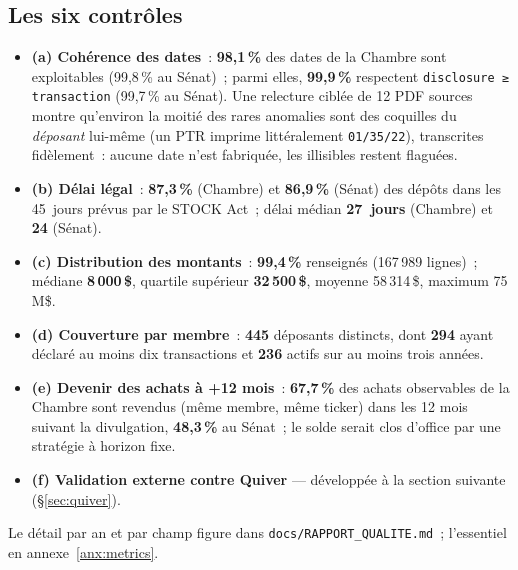 \documentclass[11pt,a4paper]{article}
\newcommand{\co}[1]{\texttt{\small #1}}
\begin{document}
\subsection{Les six contrôles}
\begin{itemize}[nosep,leftmargin=1.5em]
\item \textbf{(a) Cohérence des dates}~: \textbf{98,1\,\%} des dates de la Chambre sont exploitables
(99,8\,\% au Sénat)~; parmi elles, \textbf{99,9\,\%} respectent \co{disclosure ≥ transaction}
(99,7\,\% au Sénat). Une relecture ciblée de 12 PDF sources montre qu'environ la moitié des rares
anomalies sont des coquilles du \emph{déposant} lui-même (un PTR imprime littéralement \co{01/35/22}),
transcrites fidèlement~: aucune date n'est fabriquée, les illisibles restent flaguées.
\item \textbf{(b) Délai légal}~: \textbf{87,3\,\%} (Chambre) et \textbf{86,9\,\%} (Sénat) des dépôts dans
les 45~jours prévus par le STOCK Act~; délai médian \textbf{27~jours} (Chambre) et \textbf{24} (Sénat).
\item \textbf{(c) Distribution des montants}~: \textbf{99,4\,\%} renseignés (167\,989 lignes)~; médiane
\textbf{8\,000\,\$}, quartile supérieur \textbf{32\,500\,\$}, moyenne 58\,314\,\$, maximum 75\,M\$.
\item \textbf{(d) Couverture par membre}~: \textbf{445} déposants distincts, dont \textbf{294} ayant
déclaré au moins dix transactions et \textbf{236} actifs sur au moins trois années.
\item \textbf{(e) Devenir des achats à +12 mois}~: \textbf{67,7\,\%} des achats observables de la Chambre
sont revendus (même membre, même ticker) dans les 12 mois suivant la divulgation, \textbf{48,3\,\%} au
Sénat~; le solde serait clos d'office par une stratégie à horizon fixe.
\item \textbf{(f) Validation externe contre Quiver} — développée à la section suivante
(\S{}\ref{sec:quiver}).
\end{itemize}
Le détail par an et par champ figure dans \co{docs/RAPPORT_QUALITE.md}~; l'essentiel en
annexe~\ref{anx:metrics}.
\end{document}
